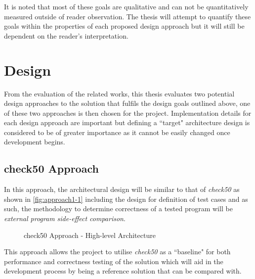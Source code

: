 \documentclass[hidelinks]{report}
\begin{document}
It is noted that most of these goals are qualitative and can not be quantitatively measured outside of reader observation. The thesis will attempt to quantify these goals within the properties of each proposed design approach but it will still be dependent on the reader's interpretation.

\clearpage
\section{Design}

From the evaluation of the related works, this thesis evaluates two potential design approaches to the solution that fulfils the design goals outlined above, one of these two approaches is then chosen for the project. Implementation details for each design approach are important but defining a ``target" architecture design is considered to be of greater importance as it cannot be easily changed once development begins.

\subsection{check50 Approach}\label{check50Approach}

In this approach, the architectural design will be similar to that of \textit{check50} as shown in \autoref{fig:approach1-1} including the design for definition of test cases and as such, the methodology to determine correctness of a tested program will be \textit{external program side-effect comparison}.

\begin{figure}[h]
	\centering
	\caption{check50 Approach - High-level Architecture}
	\label{fig:approach1-1}
\end{figure}

This approach allows the project to utilise \textit{check50} as a ``baseline" for both performance and correctness testing of the solution which will aid in the development process by being a reference solution that can be compared with.
\end{document}
